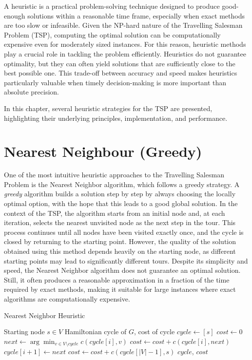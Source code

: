 A heuristic is a practical problem-solving technique designed to produce good-enough solutions within a reasonable time frame, 
especially when exact methods are too slow or infeasible. Given the NP-hard nature of the Travelling Salesman Problem (TSP), 
computing the optimal solution can be computationally expensive even for moderately sized instances. For this reason, heuristic methods 
play a crucial role in tackling the problem efficiently. Heuristics do not guarantee optimality, but they can often yield solutions 
that are sufficiently close to the best possible one. This trade-off between accuracy and speed makes heuristics particularly valuable 
when timely decision-making is more important than absolute precision.

In this chapter, several heuristic strategies for the TSP are presented, highlighting their underlying principles, implementation, and performance.

\section{Nearest Neighbour (Greedy)}

One of the most intuitive heuristic approaches to the Travelling Salesman Problem is the Nearest Neighbor algorithm, which follows a greedy strategy. 
A \textit{greedy} algorithm builds a solution step by step by always choosing the locally optimal option, with the hope that this leads to a good global solution.
In the context of the TSP, the algorithm starts from an initial node and, at each iteration, selects the nearest unvisited node as the next step in the tour. 
This process continues until all nodes have been visited exactly once, and the cycle is closed by returning to the starting point.
However, the quality of the solution obtained using this method depends heavily on the starting node, as different starting points may lead to significantly 
different tours.
Despite its simplicity and speed, the Nearest Neighbor algorithm does not guarantee an optimal solution. Still, it often produces a reasonable approximation 
in a fraction of the time required by exact methods, making it suitable for large instances where exact algorithms are computationally expensive.

\begin{algorithm}
\caption{Nearest Neighbor Heuristic}
\begin{algorithmic}[1]
\Require Starting node $s \in V$
\Ensure Hamiltonian cycle of $G$, cost of cycle
\State $cycle \gets [s]$
\State $cost \gets 0$
  \State $next \gets \arg\min_{v \in V \setminus cycle} c(cycle[i], v)$
  \State $cost \gets cost + c(cycle[i], next)$
  \State $cycle[i+1] \gets next$
\EndFor
\State $cost \gets cost + c(cycle[|V| - 1], s)$
\State \Return $cycle$, $cost$
\end{algorithmic}
\end{algorithm}

